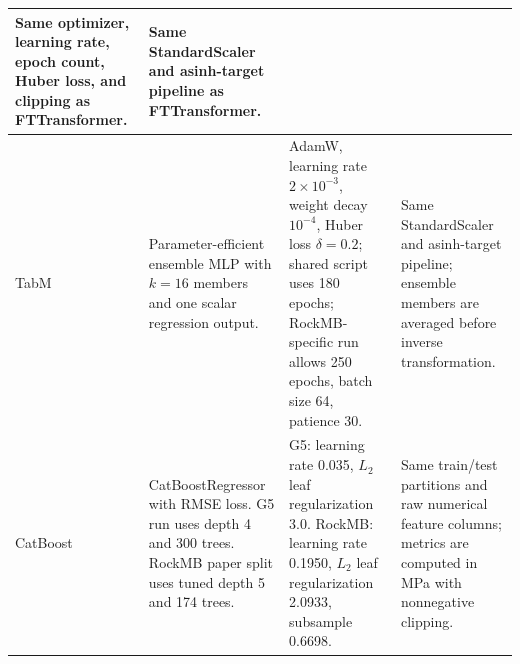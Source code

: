 \begin{table}[t]
\begin{tabular}{p{}p{}p{}p{}}
Same optimizer, learning rate, epoch count, Huber loss, and clipping as FTTransformer. &
Same StandardScaler and asinh-target pipeline as FTTransformer. \\
\midrule
TabM &
Parameter-efficient ensemble MLP with $k=16$ members and one scalar regression output. &
AdamW, learning rate $2\times10^{-3}$, weight decay $10^{-4}$, Huber loss $\delta=0.2$; shared script uses 180 epochs; RockMB-specific run allows 250 epochs, batch size 64, patience 30. &
Same StandardScaler and asinh-target pipeline; ensemble members are averaged before inverse transformation. \\
\midrule
CatBoost &
CatBoostRegressor with RMSE loss. G5 run uses depth 4 and 300 trees. RockMB paper split uses tuned depth 5 and 174 trees. &
G5: learning rate 0.035, $L_2$ leaf regularization 3.0. RockMB: learning rate 0.1950, $L_2$ leaf regularization 2.0933, subsample 0.6698. &
Same train/test partitions and raw numerical feature columns; metrics are computed in MPa with nonnegative clipping. \\
\bottomrule
\end{tabular}
\end{table}
